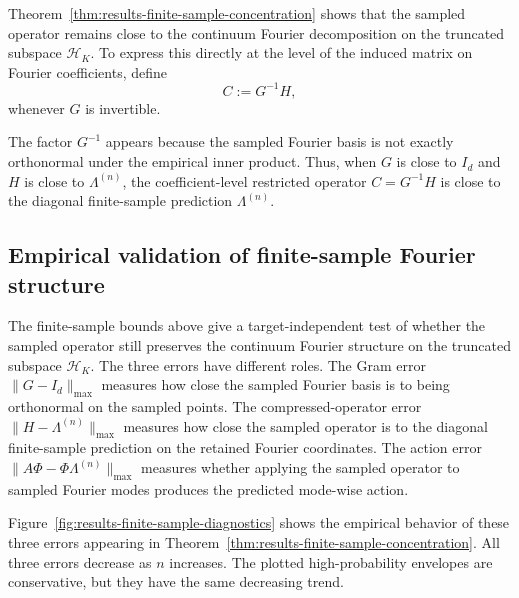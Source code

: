 Theorem~\ref{thm:results-finite-sample-concentration} shows that the sampled
operator remains close to the continuum Fourier decomposition on the truncated
subspace \(\mathcal H_K\). To express this directly at the level of the induced
matrix on Fourier coefficients, define
\begin{equation}
	C:=G^{-1}H,
	\label{eq:results-restricted-operator}
\end{equation}
whenever \(G\) is invertible.

The factor \(G^{-1}\) appears because the sampled Fourier basis is not exactly
orthonormal under the empirical inner product. Thus, when \(G\) is close to
\(I_d\) and \(H\) is close to \(\Lambda^{(n)}\), the coefficient-level
restricted operator \(C=G^{-1}H\) is close to the diagonal finite-sample
prediction \(\Lambda^{(n)}\).

\subsection{Empirical validation of finite-sample Fourier structure}
\label{subsec:results-finite-sample-validation}

The finite-sample bounds above give a target-independent test of whether the
sampled operator still preserves the continuum Fourier structure on the
truncated subspace \(\mathcal H_K\). The three errors have different roles. The
Gram error \(\|G-I_d\|_{\max}\) measures how close the sampled Fourier basis is
to being orthonormal on the sampled points. The compressed-operator error
\(\|H-\Lambda^{(n)}\|_{\max}\) measures how close the sampled operator is to
the diagonal finite-sample prediction on the retained Fourier coordinates. The
action error \(\|A\Phi-\Phi\Lambda^{(n)}\|_{\max}\) measures whether applying
the sampled operator to sampled Fourier modes produces the predicted mode-wise
action.

Figure~\ref{fig:results-finite-sample-diagnostics} shows the empirical behavior
of these three errors appearing in
Theorem~\ref{thm:results-finite-sample-concentration}. All three errors
decrease as \(n\) increases. The plotted high-probability envelopes are
conservative, but they have the same decreasing trend.

